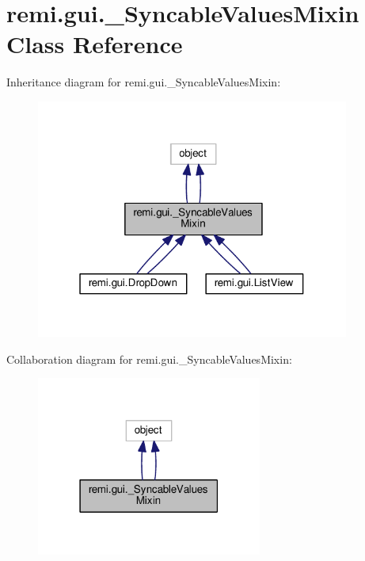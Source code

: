 \hypertarget{classremi_1_1gui_1_1__SyncableValuesMixin}{}\section{remi.\+gui.\+\_\+\+Syncable\+Values\+Mixin Class Reference}
\label{classremi_1_1gui_1_1__SyncableValuesMixin}


Inheritance diagram for remi.\+gui.\+\_\+\+Syncable\+Values\+Mixin\+:
\nopagebreak
\begin{figure}[H]
\begin{center}
\leavevmode
\includegraphics[width=292pt]{dd/dbe/classremi_1_1gui_1_1__SyncableValuesMixin__inherit__graph}
\end{center}
\end{figure}


Collaboration diagram for remi.\+gui.\+\_\+\+Syncable\+Values\+Mixin\+:
\nopagebreak
\begin{figure}[H]
\begin{center}
\leavevmode
\includegraphics[width=210pt]{d9/de2/classremi_1_1gui_1_1__SyncableValuesMixin__coll__graph}
\end{center}
\end{figure}
